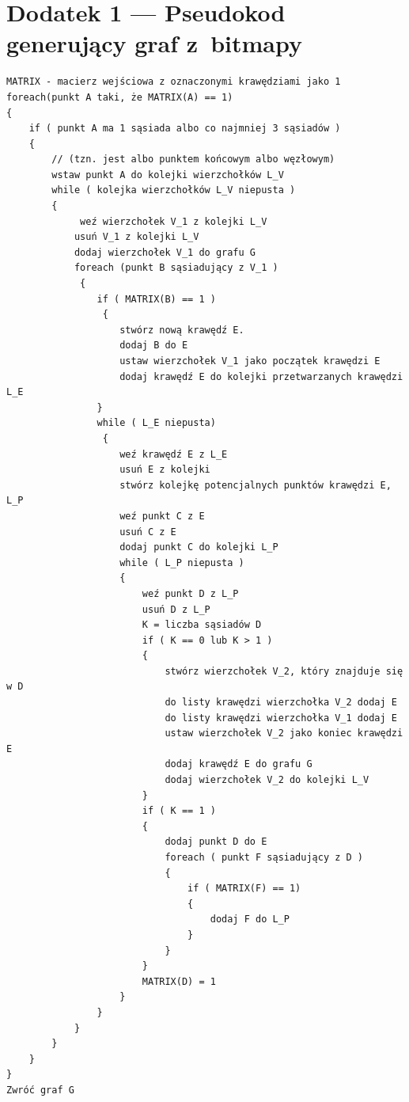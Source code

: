 \documentclass[a4paper,11pt,twoside,openright]{report}
\theoremstyle{definition}
\begin{document}
\chapter*{Dodatek 1 --- Pseudokod generujący graf z~bitmapy}

\begin{verbatim}
MATRIX - macierz wejściowa z oznaczonymi krawędziami jako 1
foreach(punkt A taki, że MATRIX(A) == 1)
{
    if ( punkt A ma 1 sąsiada albo co najmniej 3 sąsiadów )
    {
        // (tzn. jest albo punktem końcowym albo węzłowym)
        wstaw punkt A do kolejki wierzchołków L_V
        while ( kolejka wierzchołków L_V niepusta )
        {
             weź wierzchołek V_1 z kolejki L_V
            usuń V_1 z kolejki L_V
            dodaj wierzchołek V_1 do grafu G
            foreach (punkt B sąsiadujący z V_1 )
             {
                if ( MATRIX(B) == 1 )
                 {
                    stwórz nową krawędź E.
                    dodaj B do E
                    ustaw wierzchołek V_1 jako początek krawędzi E
                    dodaj krawędź E do kolejki przetwarzanych krawędzi L_E
                }
                while ( L_E niepusta)
                 {
                    weź krawędź E z L_E
                    usuń E z kolejki
                    stwórz kolejkę potencjalnych punktów krawędzi E, L_P
                    weź punkt C z E
                    usuń C z E
                    dodaj punkt C do kolejki L_P
                    while ( L_P niepusta )
                    {
                        weź punkt D z L_P
                        usuń D z L_P
                        K = liczba sąsiadów D
                        if ( K == 0 lub K > 1 )
                        {
                            stwórz wierzchołek V_2, który znajduje się w D
                            do listy krawędzi wierzchołka V_2 dodaj E
                            do listy krawędzi wierzchołka V_1 dodaj E
                            ustaw wierzchołek V_2 jako koniec krawędzi E
                            dodaj krawędź E do grafu G
                            dodaj wierzchołek V_2 do kolejki L_V
                        }
                        if ( K == 1 )
                        {
                            dodaj punkt D do E
                            foreach ( punkt F sąsiadujący z D )
                            {
                                if ( MATRIX(F) == 1)
                                {
                                    dodaj F do L_P
                                }
                            }
                        }
                        MATRIX(D) = 1
                    }
                }
            }
        }
    }
}
Zwróć graf G
\end{verbatim}
\end{document}
